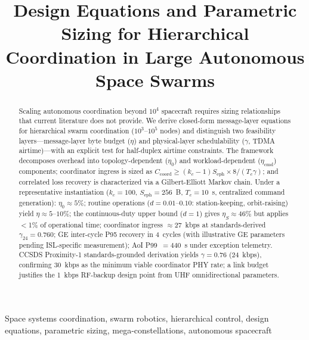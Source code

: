 \documentclass[journal]{IEEEtran}
\begin{document}
\title{Design Equations and Parametric Sizing for Hierarchical Coordination in Large Autonomous Space Swarms}

\author{
}


\maketitle

\begin{abstract}
Scaling autonomous coordination beyond $10^4$ spacecraft requires sizing relationships that current literature does not provide. We derive closed-form message-layer equations for hierarchical swarm coordination ($10^3$--$10^5$ nodes) and distinguish two feasibility layers---message-layer byte budget ($\eta$) and physical-layer schedulability ($\gamma$, TDMA airtime)---with an explicit test for half-duplex airtime constraints. The framework decomposes overhead into topology-dependent ($\eta_0$) and workload-dependent ($\eta_{\text{cmd}}$) components; coordinator ingress is sized as $C_{\text{coord}} \geq (k_c - 1) S_{\text{eph}} \times 8 / (T_c \gamma)$; and correlated loss recovery is characterized via a Gilbert-Elliott Markov chain. Under a representative instantiation ($k_c = 100$, $S_{\text{eph}} = 256$~B, $T_c = 10$~s, centralized command generation): $\eta_0 \approx 5\%$; routine operations ($d = 0.01$--$0.10$: station-keeping, orbit-raising) yield $\eta \approx 5$--$10\%$; the continuous-duty upper bound ($d = 1$) gives $\eta_S \approx 46\%$ but applies $<$1\% of operational time; coordinator ingress $\approx 27$~kbps at standards-derived $\gamma_{24} = 0.760$; GE inter-cycle P95 recovery in 4~cycles (with illustrative GE parameters pending ISL-specific measurement); AoI P99~$= 440$~s under exception telemetry. CCSDS Proximity-1 standards-grounded derivation yields $\gamma = 0.76$ (24~kbps), confirming 30~kbps as the minimum viable coordinator PHY rate; a link budget justifies the 1~kbps RF-backup design point from UHF omnidirectional parameters.
\end{abstract}

\begin{IEEEkeywords}
Space systems coordination, swarm robotics, hierarchical control, design equations, parametric sizing, mega-constellations, autonomous spacecraft
\end{IEEEkeywords}
\end{document}
